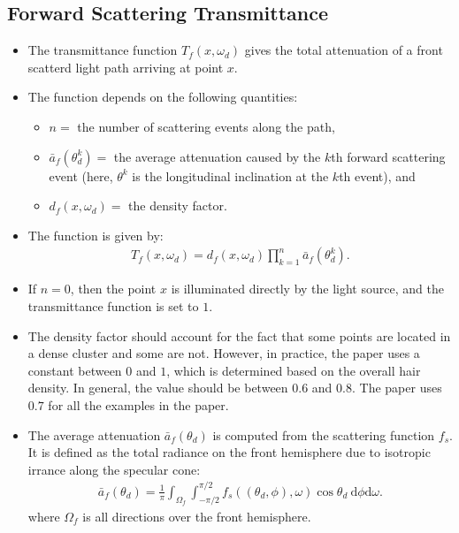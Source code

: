 \documentclass[10pt]{article}
\newcommand{\dee}{\mathrm{d}}
\begin{document}
  \subsection{Forward Scattering Transmittance}
  \begin{itemize}
    \item The transmittance function $T_f(x, \omega_d)$ gives the total attenuation of a front scatterd light path arriving at point $x$.

    \item The function depends on the following quantities:
    \begin{itemize}
      \item $n = $ the number of scattering events along the path,      
      \item $\bar{a}_f(\theta_d^k) = $ the average attenuation caused by the $k$th forward scattering event (here, $\theta^k$ is the longitudinal inclination at the $k$th event), and
      \item $d_f(x, \omega_d) = $ the density factor.
    \end{itemize}

    \item The function is given by:
    \begin{align*}
      T_f(x, \omega_d) = d_f(x,\omega_d) \prod_{k=1}^n \bar{a}_f(\theta^k_d).
    \end{align*}

    \item If $n=0$, then the point $x$ is illuminated directly by the light source, and the transmittance function is set to $1$.

    \item The density factor should account for the fact that some points are located in a dense cluster and some are not.  However, in practice, the paper uses a constant between $0$ and $1$, which is determined based on the overall hair density.  In general, the value should be between $0.6$ and $0.8$.  The paper uses $0.7$ for all the examples in the paper.

    \item The average attenuation $\bar{a}_f(\theta_d)$ is computed from the scattering function $f_s$.  It is defined as the total radiance on the front hemisphere due to isotropic irrance along the specular cone:
    \begin{align*}
      \bar{a}_f(\theta_d) = \frac{1}{\pi} \int_{\Omega_f} \int_{-\pi/2}^{\pi/2} f_s((\theta_d, \phi),\omega) \cos \theta_d\ \dee\phi \dee \omega.
    \end{align*}
    where $\Omega_f$ is all directions over the front hemisphere.
  \end{itemize}
\end{document}
